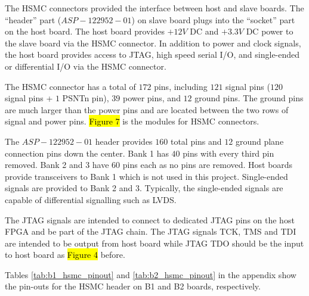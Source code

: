 The HSMC connectors provided the interface between host and slave boards. The ``header'' part ($ASP-122952-01$) on slave board plugs into the ``socket'' part on the host board. The host board provides $+12V$ DC and $+3.3V$ DC power to the slave board via the HSMC connector. In addition to power and clock signals, the host board provides access to JTAG, high speed serial I/O, and single-ended or differential I/O via the HSMC connector.

The HSMC connector has a total of $172$ pins, including $121$ signal pins ($120$ signal pins + $1$ PSNTn pin), $39$ power pins, and $12$ ground pins. The ground pins are much larger than the power pins and are located between the two rows of signal and power pins. \hl{Figure 7} is the modules for HSMC connectors.



The $ASP-122952-01$ header provides $160$ total pins and $12$ ground plane connection pins down the center. Bank 1 has $40$ pins with every third pin removed. Bank 2 and 3 have $60$ pins each as no pins are removed. Host boards provide transceivers to Bank 1 which is not used in this project. Single-ended signals are provided to Bank 2 and 3. Typically, the single-ended signals are capable of differential signalling such as LVDS.

The JTAG signals are intended to connect to dedicated JTAG pins on the host FPGA and be part of the JTAG chain. The JTAG signals TCK, TMS and TDI are intended to be output from host board while JTAG TDO should be the input to host board as \hl{Figure 4} before.

Tables \ref{tab:b1_hsmc_pinout} and \ref{tab:b2_hsmc_pinout} in the appendix show the pin-outs for the HSMC header on B1 and B2 boards, respectively.










%
%
%
%
%


